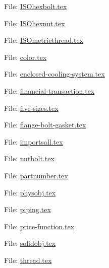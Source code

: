 \documentclass[notes]{mikoslides}
\begin{document}
\begin{center}\LARGE File: \url{ISOhexbolt.tex}\end{center}
\newpage
\begin{center}\LARGE File: \url{ISOhexnut.tex}\end{center}
\newpage
\begin{center}\LARGE File: \url{ISOmetricthread.tex}\end{center}
\newpage
\begin{center}\LARGE File: \url{color.tex}\end{center}
\newpage
\begin{center}\LARGE File: \url{enclosed-cooling-system.tex}\end{center}
\newpage
\begin{center}\LARGE File: \url{financial-transaction.tex}\end{center}
\newpage
\begin{center}\LARGE File: \url{five-sizes.tex}\end{center}
\newpage
\begin{center}\LARGE File: \url{flange-bolt-gasket.tex}\end{center}
\newpage
\begin{center}\LARGE File: \url{importsall.tex}\end{center}
\newpage
\begin{center}\LARGE File: \url{nutbolt.tex}\end{center}
\newpage
\begin{center}\LARGE File: \url{partnumber.tex}\end{center}
\newpage
\begin{center}\LARGE File: \url{physobj.tex}\end{center}
\newpage
\begin{center}\LARGE File: \url{piping.tex}\end{center}
\newpage
\begin{center}\LARGE File: \url{price-function.tex}\end{center}
\newpage
\begin{center}\LARGE File: \url{solidobj.tex}\end{center}
\newpage
\begin{center}\LARGE File: \url{thread.tex}\end{center}
\newpage


\printindex
\end{document}
